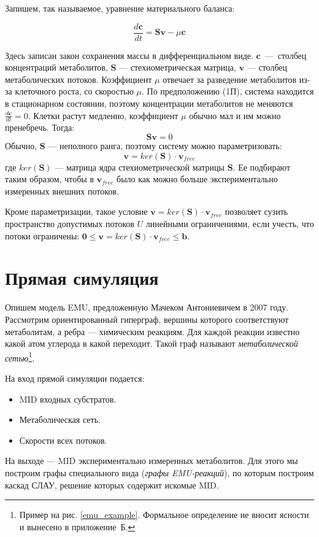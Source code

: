 \documentclass[14pt, a4paper]{extreport}
\begin{document}
Запишем, так называемое, уравнение материального баланса:

$$\frac{d\textbf{c}}{dt} = \textbf{Sv} - \mu{}\textbf{c}$$

Здесь записан закон сохранения массы в дифференциальном виде. $\textbf{c}$~---~столбец концентраций метаболитов, $\textbf{S}$ --- стехиометрическая матрица, $\textbf{v}$ --- столбец метаболических потоков. Коэффициент $\mu$ отвечает за разведение метаболитов из-за клеточного роста, со скоростью $\mu$. По предположению (1П), система находится в стационарном состоянии, поэтому концентрации метаболитов не меняются $\frac{d\textbf{c}}{dt} = 0$. Клетки растут медленно, коэффициент $\mu$ обычно мал и им можно пренебречь. Тогда:
$$ \textbf{Sv} = 0$$
Обычно, $\mathbf{S}$ --- неполного ранга, поэтому систему можно параметризовать:
$$ \mathbf{v} = ker(\mathbf{S}) \cdot \mathbf{v}_{free}$$
где $ker(\textbf{S})$ --- матрица ядра стехиометрической матрицы $\mathbf{S}$. Ее подбирают таким образом, чтобы в $\mathbf{v}_{free}$ было как можно больше экспериментально измеренных внешних потоков.

Кроме параметризации, такое условие $\mathbf{v} = ker(\mathbf{S}) \cdot \mathbf{v}_{free}$ позволяет сузить пространство допустимых потоков $U$ линейными ограничениями, если учесть, что потоки ограничены: $\mathbf{0} \le \mathbf{v} = ker(\mathbf{S}) \cdot \mathbf{v}_{free} \le \mathbf{b}$.



\clearpage
\section{Прямая симуляция}
Опишем модель EMU, предложенную Мачеком Антониевичем в 2007 году\cite{EMU_2007}. Рассмотрим ориентированный гиперграф, вершины которого соответствуют метаболитам, а ребра --- химическим реакциям. Для каждой реакции известно какой атом углерода в какой переходит. Такой граф называют \emph{метаболической сетью}\footnote{Пример на рис. \ref{emu_example}. Формальное определение не вносит ясности и вынесено в приложение~Б.}. 

На вход прямой симуляции подается:
\begin{itemize}
	\item MID входных субстратов.
	\item Метаболическая сеть.
	\item Скорости всех потоков.
\end{itemize}
На выходе --- MID экспериментально измеренных метаболитов.
Для этого мы построим графы специального вида (\emph{графы EMU-реакций}), по которым построим каскад СЛАУ, решение которых содержит искомые MID.
\end{document}

